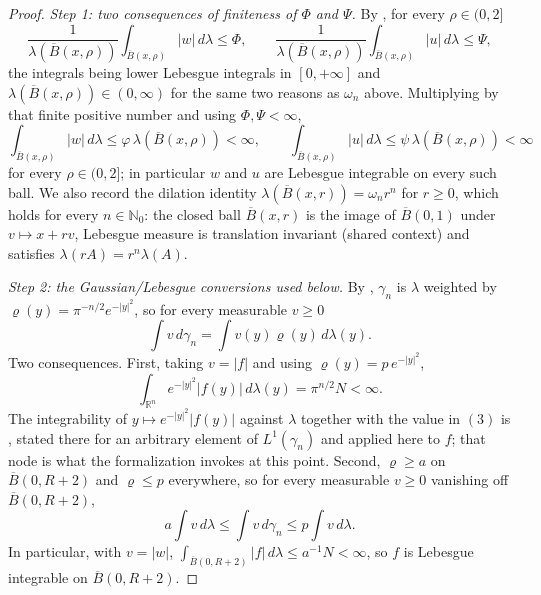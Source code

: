 \begin{proof}
\emph{Step 1: two consequences of finiteness of $\Phi$ and $\Psi$.}
By , for every $\rho \in (0,2]$
\[
  \frac{1}{\lambda(\overline B(x,\rho))}\int_{\overline B(x,\rho)}|w|\,d\lambda
    \leq \Phi ,
  \qquad
  \frac{1}{\lambda(\overline B(x,\rho))}\int_{\overline B(x,\rho)}|u|\,d\lambda
    \leq \Psi ,
\]
the integrals being lower Lebesgue integrals in $[0,+\infty]$ and
$\lambda(\overline B(x,\rho)) \in (0,\infty)$ for the same two reasons as
$\omega_n$ above.  Multiplying by that finite positive number and using
$\Phi,\Psi < \infty$,
\begin{equation*}
  \int_{\overline B(x,\rho)}|w|\,d\lambda \leq \varphi\,\lambda(\overline B(x,\rho)) < \infty,
  \qquad
  \int_{\overline B(x,\rho)}|u|\,d\lambda \leq \psi\,\lambda(\overline B(x,\rho)) < \infty
  \tag{1}
\end{equation*}
for every $\rho \in (0,2]$; in particular $w$ and $u$ are Lebesgue integrable
on every such ball.  We also record the dilation identity
$\lambda(\overline B(x,r)) = \omega_n r^n$ for $r \geq 0$, which holds for every
$n \in \mathbb{N}_0$: the closed ball $\overline B(x,r)$ is the image of
$\overline B(0,1)$ under $v \mapsto x + rv$, Lebesgue measure is translation
invariant (shared context) and satisfies $\lambda(rA) = r^n\lambda(A)$.

\emph{Step 2: the Gaussian/Lebesgue conversions used below.}
By , $\gamma_n$ is $\lambda$ weighted by
$\varrho(y) = \pi^{-n/2}e^{-|y|^2}$, so for every measurable $v \geq 0$
\begin{equation*}
  \int v\,d\gamma_n = \int v(y)\varrho(y)\,d\lambda(y) . \tag{2}
\end{equation*}
Two consequences.  First, taking $v = |f|$ and using $\varrho(y) = p\,e^{-|y|^2}$,
\begin{equation*}
  \int_{\mathbb{R}^n}e^{-|y|^2}|f(y)|\,d\lambda(y) = \pi^{n/2}N < \infty .
  \tag{3}
\end{equation*}
The integrability of $y \mapsto e^{-|y|^2}|f(y)|$ against $\lambda$ together with the
value in $(3)$ is , stated there for an
arbitrary element of $L^1(\gamma_n)$ and applied here to $f$; that node is what the
formalization invokes at this point.
Second, $\varrho \geq a$ on $\overline B(0,R+2)$ and $\varrho \leq p$
everywhere, so for every measurable $v \geq 0$ vanishing off
$\overline B(0,R+2)$,
\begin{equation*}
  a\int v\,d\lambda \leq \int v\,d\gamma_n \leq p\int v\,d\lambda . \tag{4}
\end{equation*}
In particular, with $v = |w|$, $\int_{\overline B(0,R+2)}|f|\,d\lambda
 \leq a^{-1}N < \infty$, so $f$ is Lebesgue integrable on
$\overline B(0,R+2)$.


\end{proof}
